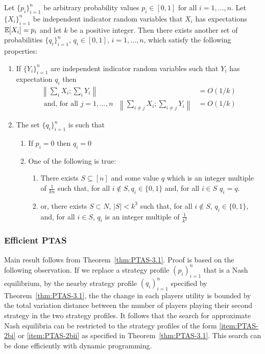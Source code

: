 \begin{theorem}
	\label{thm:PTAS-3.1}
	Let $\{p_i\}_{i=1}^n$ be arbitrary probability values $p_i \in [0,1]$ for all $i= 1,\dots, n$. Let $\{X_i\}_{i=1}^n$ be independent indicator random variables that $X_i$ has expectations $\mathbb{E}[X_i] = p_i$ and let $k$ be a positive integer. Then there exists another set of probabilities $\{q_i\}_{i=1}^n$, $q_i \in [0,1]$, $i = 1, \dots, n$, which satisfy the following properties:
	\begin{enumerate}
		\item If $\{Y_i\}_{i=1}^n$ are independent indicator random variables such that $Y_i$ has expectation $q_i$ then 
		\label{item:PTAS-1}
		\begin{align}
			\label{eq:PTAS-1}
		    \left\|\sum_{i}X_i;\sum_i Y_i\right\| &= O(1/k) \\
		    \label{eq:PTAS-2}
		    \text{ and, for all $j = 1,\dots, n$ }\left\|\sum_{i\neq j }X_i ; \sum_{i \neq j} Y_i \right\| &= O(1/k)
		\end{align}
		
		\item The set $\{q_i\}_{i=1}^n$ is such that 
		\label{item:PTAS-2}
		\begin{enumerate}
			\item If $p_i = 0$ then $q_i = 0$ \label{item:PTAS-2a}
			\item One of the following is true: \label{item:PTAS-2b}
			\begin{enumerate}
				\item There exists $S\subseteq [n]$ and some value $q$ which is an integer multiple of $\frac{1}{kn}$ such that, for all $i\not\in S, q_i \in \{0,1\}$ and, for all $i \in S$ $q_i = q$.
				\label{item:PTAS-2bi}
				\item or, there exists $S \subset N$, $|S| < k^3$ such that, for all $i\not\in S$, $q_i \in \{0,1\}$, and, for all $i \in S$, $q_i$ is an integer multiple of $\frac{1}{k^2}$
				\label{item:PTAS-2bii}
			\end{enumerate}
		\end{enumerate}
	\end{enumerate}
\end{theorem}
\subsubsection{Efficient PTAS}
Main result follows from Theorem~\ref{thm:PTAS-3.1}. Proof is based on the following observation. If we replace a strategy profile $(p_i)_{i=1}^n$ that is a Nash equilibrium, by the nearby strategy profile $(q_i)_{i=1}^n$ specified by Theorem~\ref{thm:PTAS-3.1}, the the change in each players utility is bounded by the total variation distance between the number of players playing their second strategy in the two strategy profiles. It follows that the search for approximate Nash equilibria can be restricted to the strategy profiles of the form \ref{item:PTAS-2bi} or \ref{item:PTAS-2bii} as specified in Theorem~\ref{thm:PTAS-3.1}. This search can be done efficiently with dynamic programming. 

